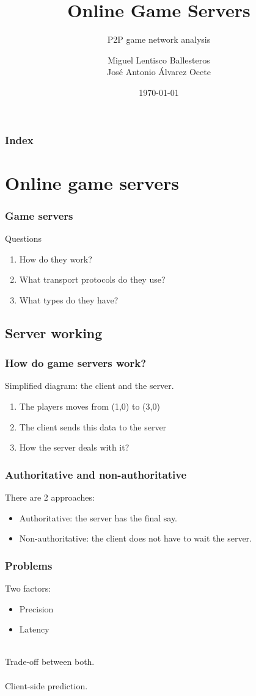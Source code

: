 \documentclass{beamer}
\title[Online Game Servers]{Online Game Servers}
\subtitle{P2P game network analysis}
\author{Miguel Lentisco Ballesteros \\ José Antonio Álvarez Ocete}
\date{\today}
\begin{document}
\frame{\titlepage}

\begin{frame}
	\frametitle{Index}
	\tableofcontents
\end{frame}

\section{Online game servers}
\begin{frame}
	\frametitle{Game servers}
	\begin{block}{Questions}
		\begin{enumerate}
			\item How do they work?
			\item What transport protocols do they use?
			\item What types do they have?
		\end{enumerate}
	\end{block}
\end{frame}

\subsection{Server working}
\begin{frame}
	\frametitle{How do game servers work?}
	Simplified diagram: the client and the server.
	\begin{enumerate}
		\item The players moves from (1,0) to (3,0)
		\item The client sends this data to the server
		\item How the server deals with it?
	\end{enumerate}
\end{frame}

\begin{frame}
	\frametitle{Authoritative and non-authoritative}
	There are 2 approaches:
	\begin{itemize}
		\item \alert{Authoritative}: the server has the final say.
		\item \alert{Non-authoritative}: the client does not have to wait the server.
	\end{itemize}
	\pause
\end{frame}

\begin{frame}
	\frametitle{Problems}
	Two factors:
	\begin{itemize}
		\item \alert{Precision}
		\item \alert{Latency} \\~\\
	\end{itemize}
	Trade-off between both. \\~\\ 
 	\pause
	Client-side prediction.
\end{frame}
\end{document}
